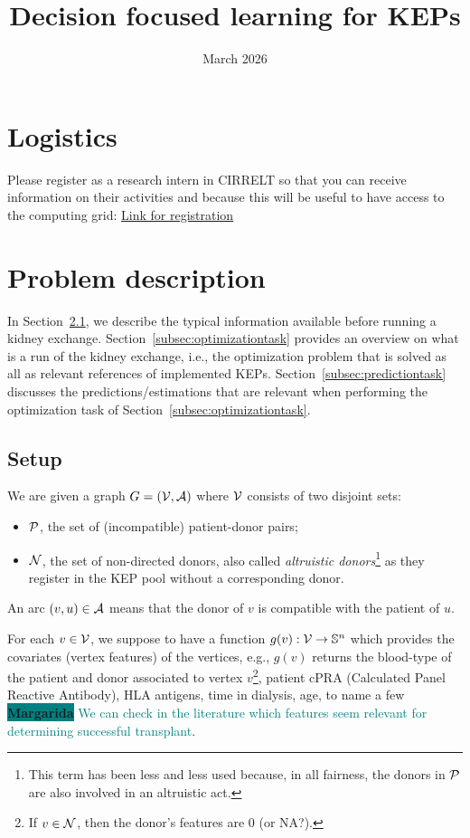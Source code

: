 \documentclass{article}
\title{Decision focused learning for KEPs}
\date{March 2026}
\newcommand{\margarida}[1]{\colorbox{teal}{\color{white}   \textsf{\textbf{Margarida}}} \textcolor{teal}{#1}}
\begin{document}
\maketitle

\section{Logistics}

Please register as a research intern in CIRRELT so that you can receive information on their activities and because this will be useful to have access to the computing grid: 
\href{https://www.cirrelt.ca/default.aspx?PAGE=INSCRIPTION}{Link for registration}

\section{Problem description}
In Section~\ref{subsec:setup}, we describe the typical information available before running a kidney exchange. Section~\ref{subsec:optimizationtask} provides an overview on what is a run of the kidney exchange, i.e., the optimization problem that is solved as all as relevant references of implemented KEPs. Section~\ref{subsec:predictiontask} discusses the predictions/estimations that are relevant when performing the optimization task of Section~\ref{subsec:optimizationtask}.

\subsection{Setup}\label{subsec:setup}
We are given a graph $G=(\mathcal{V},\mathcal{A})$ where $\mathcal{V}$ consists of two disjoint sets:
\begin{itemize}
    \item $\mathcal{P}$, the set of (incompatible) patient-donor pairs;
    \item $\mathcal{N}$, the set of non-directed donors, also called \emph{altruistic donors}\footnote{This term has been less and less used because, in all fairness, the donors in $\mathcal{P}$ are also involved in an altruistic act.} as they register in the KEP pool without a corresponding donor.
\end{itemize}
An arc $(v,u) \in \mathcal{A}$ means that the donor of $v$ is compatible with the patient of $u$.

For each $v \in \mathcal{V}$, we suppose to have a function $g(v): \mathcal{V} \rightarrow \mathbb{S}^n$ which provides the covariates (vertex features) of the vertices, e.g., $g(v)$ returns the blood-type of the patient and donor associated to vertex $v$\footnote{If $v \in \mathcal{N}$, then the donor's features are 0 (or NA?).}, patient cPRA (Calculated Panel Reactive Antibody), HLA antigens, time in dialysis, age, to name a few \margarida{We can check in the literature which features seem relevant for determining successful transplant}. 
\end{document}
